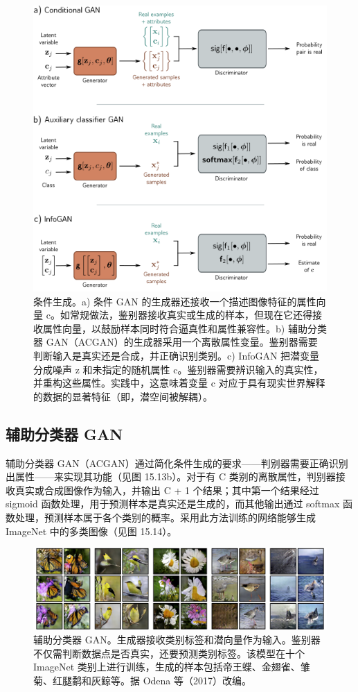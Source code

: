 \begin{figure}[ht!]
\centering
\includegraphics[width=0.7\linewidth]{png/chapter15/GanConditional.png}
\caption{条件生成。a) 条件 GAN 的生成器还接收一个描述图像特征的属性向量 c。如常规做法，鉴别器接收真实或生成的样本，但现在它还得接收属性向量，以鼓励样本同时符合逼真性和属性兼容性。b) 辅助分类器 GAN（ACGAN）的生成器采用一个离散属性变量。鉴别器需要判断输入是真实还是合成，并正确识别类别。c) InfoGAN 把潜变量分成噪声 z 和未指定的随机属性 c。鉴别器需要辨识输入的真实性，并重构这些属性。实践中，这意味着变量 c 对应于具有现实世界解释的数据的显著特征（即，潜空间被解耦）。}
\end{figure}

\subsection{辅助分类器 GAN}
辅助分类器 GAN（ACGAN）通过简化条件生成的要求——判别器需要正确识别出属性——来实现其功能（见图 15.13b）。对于有 C 类别的离散属性，判别器接收真实或合成图像作为输入，并输出 C + 1 个结果；其中第一个结果经过 sigmoid 函数处理，用于预测样本是真实还是生成的，而其他输出通过 softmax 函数处理，预测样本属于各个类别的概率。采用此方法训练的网络能够生成 ImageNet 中的多类图像（见图 15.14）。

\begin{figure}[ht!]
\centering
\includegraphics[width=0.7\linewidth]{png/chapter15/GANACGANResults.png}
\caption{辅助分类器 GAN。生成器接收类别标签和潜向量作为输入。鉴别器不仅需判断数据点是否真实，还要预测类别标签。该模型在十个 ImageNet 类别上进行训练，生成的样本包括帝王蝶、金翅雀、雏菊、红腿鹬和灰鲸等。据 Odena 等（2017）改编。}
\end{figure}


